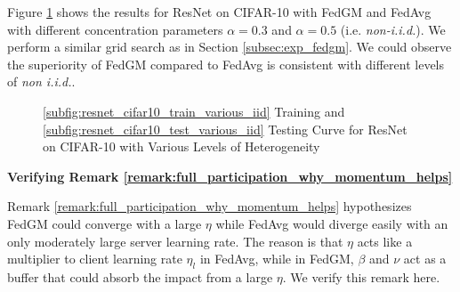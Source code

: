Figure \ref{fig:cifar10_resnet_various_niid_result} shows the results for ResNet on CIFAR-10 with FedGM and FedAvg with different concentration parameters $\alpha=0.3$ and $\alpha=0.5$ (i.e. \textit{non-i.i.d.}). We perform a similar grid search as in Section \ref{subsec:exp_fedgm}. We could observe the superiority of FedGM compared to FedAvg is consistent with different levels of \textit{non i.i.d.}.


\begin{figure}[h]
\vspace*{-6pt}
\centering
{}
\vspace*{-6pt}
\caption{\ref{subfig:resnet_cifar10_train_various_iid} Training and \ref{subfig:resnet_cifar10_test_various_iid} Testing Curve for ResNet on CIFAR-10 with Various Levels of Heterogeneity}
\label{fig:cifar10_resnet_various_niid_result}
\end{figure}

\textbf{Verifying Remark \ref{remark:full_participation_why_momentum_helps}}

Remark \ref{remark:full_participation_why_momentum_helps} hypothesizes FedGM could converge with a large $\eta$ while FedAvg would diverge easily with an only moderately large server learning rate. The reason is that $\eta$ acts like a multiplier to client learning rate $\eta_l$ in FedAvg, while in FedGM, $\beta$ and $\nu$ act as a buffer that could absorb the impact from a large $\eta$. We verify this remark here.


